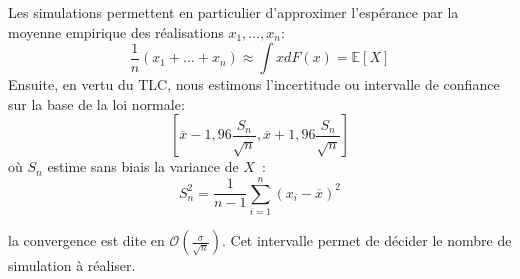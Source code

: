 %
%	
%	
%	
%	
%	
%	
%	
%	
%	

\begin{f}
	
	Les simulations permettent en particulier d'approximer l'espérance par la moyenne empirique des réalisations \(x_1,\ldots,x_n\):
	\[
	\frac{1}{n}(x_1+\ldots+x_n)\approx \int xdF(x)=\mathbb{E}[X]
	\]
	Ensuite, en vertu du TLC, nous estimons l'incertitude ou intervalle de confiance sur la base de la loi normale:
	\[
	\left[\overline{x}-1,96\frac{S_n}{\sqrt{n}},\overline{x}+1,96\frac{S_n}{\sqrt{n}}\right]
	\]
	où \(S_n\) estime sans biais la variance de \(X\)~:
	\[
	S_n^2=\frac{1}{n-1}\sum_{i=1}^{n}(x_i-\overline{x})^2
	\]
	
	la convergence est dite en \(\mathcal{O}(\frac{\sigma}{\sqrt{n}})\). 	
	Cet intervalle permet de décider le nombre de simulation à réaliser.
\end{f}

